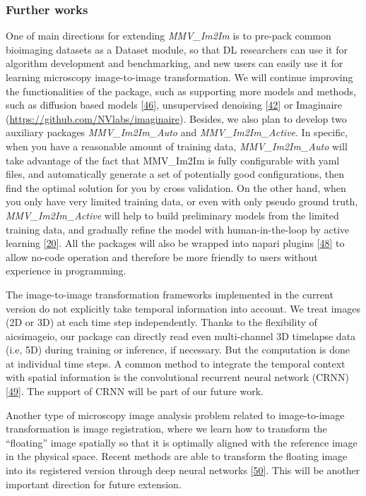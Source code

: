 \hypertarget{further-works}{%
\subsubsection{Further works}\label{further-works}}

One of main directions for extending \emph{MMV\_Im2Im} is to pre-pack common bioimaging datasets as a Dataset module, so that DL researchers can use it for algorithm development and benchmarking, and new users can easily use it for learning microscopy image-to-image transformation. We will continue improving the functionalities of the package, such as supporting more models and methods, such as diffusion based models {[}\protect\hyperlink{ref-1A3yurr7m}{46}{]}, unsupervised denoising {[}\protect\hyperlink{ref-4vnyY9J9}{42}{]} or Imaginaire (\url{https://github.com/NVlabs/imaginaire}). Besides, we also plan to develop two auxiliary packages \emph{MMV\_Im2Im\_Auto} and \emph{MMV\_Im2Im\_Active}. In specific, when you have a reasonable amount of training data, \emph{MMV\_Im2Im\_Auto} will take advantage of the fact that MMV\_Im2Im is fully configurable with yaml files, and automatically generate a set of potentially good configurations, then find the optimal solution for you by cross validation. On the other hand, when you only have very limited training data, or even with only pseudo ground truth, \emph{MMV\_Im2Im\_Active} will help to build preliminary models from the limited training data, and gradually refine the model with human-in-the-loop by active learning {[}\protect\hyperlink{ref-jM3v1UjQ}{20}{]}. All the packages will also be wrapped into napari plugins {[}\protect\hyperlink{ref-YEMgt2T4}{48}{]} to allow no-code operation and therefore be more friendly to users without experience in programming.

The image-to-image transformation frameworks implemented in the current version do not explicitly take temporal information into account. We treat images (2D or 3D) at each time step independently. Thanks to the flexibility of aicsimageio, our package can directly read even multi-channel 3D timelapse data (i.e, 5D) during training or inference, if necessary. But the computation is done at individual time steps. A common method to integrate the temporal context with spatial information is the convolutional recurrent neural network (CRNN) {[}\protect\hyperlink{ref-s2RBSHdH}{49}{]}. The support of CRNN will be part of our future work.

Another type of microscopy image analysis problem related to image-to-image transformation is image registration, where we learn how to transform the ``floating'' image spatially so that it is optimally aligned with the reference image in the physical space. Recent methods are able to transform the floating image into its registered version through deep neural networks {[}\protect\hyperlink{ref-1Fh9QLxl9}{50}{]}. This will be another important direction for future extension.

